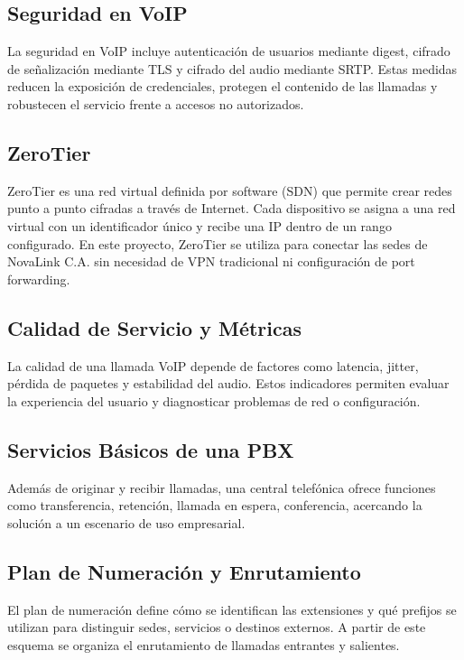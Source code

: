 \documentclass[12pt,a4paper]{article}
\begin{document}
\subsection{Seguridad en VoIP}

La seguridad en VoIP incluye autenticación de usuarios mediante digest, cifrado de señalización mediante TLS y cifrado del audio mediante SRTP. Estas medidas reducen la exposición de credenciales, protegen el contenido de las llamadas y robustecen el servicio frente a accesos no autorizados.

\subsection{ZeroTier}

ZeroTier es una red virtual definida por software (SDN) que permite crear redes punto a punto cifradas a través de Internet. Cada dispositivo se asigna a una red virtual con un identificador único y recibe una IP dentro de un rango configurado. En este proyecto, ZeroTier se utiliza para conectar las sedes de NovaLink C.A. sin necesidad de VPN tradicional ni configuración de port forwarding.

\subsection{Calidad de Servicio y Métricas}

La calidad de una llamada VoIP depende de factores como latencia, jitter, pérdida de paquetes y estabilidad del audio. Estos indicadores permiten evaluar la experiencia del usuario y diagnosticar problemas de red o configuración.

\subsection{Servicios Básicos de una PBX}

Además de originar y recibir llamadas, una central telefónica ofrece funciones como transferencia, retención, llamada en espera, conferencia, acercando la solución a un escenario de uso empresarial.

\subsection{Plan de Numeración y Enrutamiento}

El plan de numeración define cómo se identifican las extensiones y qué prefijos se utilizan para distinguir sedes, servicios o destinos externos. A partir de este esquema se organiza el enrutamiento de llamadas entrantes y salientes.
\end{document}
